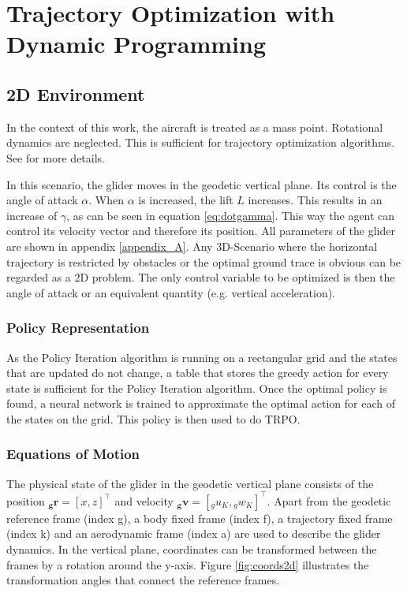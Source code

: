 \chapter{Trajectory Optimization with Dynamic Programming}
\label{chapter5}
\section{2D Environment}

In the context of this work, the aircraft is treated as a mass point. Rotational dynamics are neglected. This is sufficient for trajectory optimization algorithms. See \cite{Fichter2009} for more details. 


In this scenario, the glider moves in the geodetic vertical plane. Its control is the angle of attack $\alpha$. When $\alpha$ is increased, the lift $L$ increases. This results in an increase of $\gamma$, as can be seen in equation \ref{eq:dotgamma}. This way the agent can control its velocity vector and therefore its position. All parameters of the glider are shown in appendix \ref{appendix_A}. Any 3D-Scenario where the horizontal trajectory is restricted by obstacles or the optimal ground trace is obvious can be regarded as a 2D problem. The only control variable to be optimized is then the angle of attack or an equivalent quantity (e.g. vertical acceleration).

\subsection{Policy Representation}

As the Policy Iteration algorithm is running on a rectangular grid and the states that are updated do not change, a table that stores the greedy action for every state is sufficient for the Policy Iteration algorithm. Once the optimal policy is found, a neural network is trained to approximate the optimal action for each of the states on the grid. This policy is then used to do TRPO.

\subsection{Equations of Motion}

The physical state of the glider in the geodetic vertical plane consists of the position $\boldsymbol{{}_g r}=[x,z]^\top$ and velocity $\boldsymbol{{}_g v}=[{}_g u_K,{}_g w_K]^\top$. Apart from the geodetic reference frame (index g), a body fixed frame (index f), a trajectory fixed frame (index k) and an aerodynamic frame (index a) are used to describe the glider dynamics. In the vertical plane, coordinates can be transformed between the frames by a rotation around the y-axis. Figure \ref{fig:coords2d} illustrates the transformation angles that connect the reference frames. 

